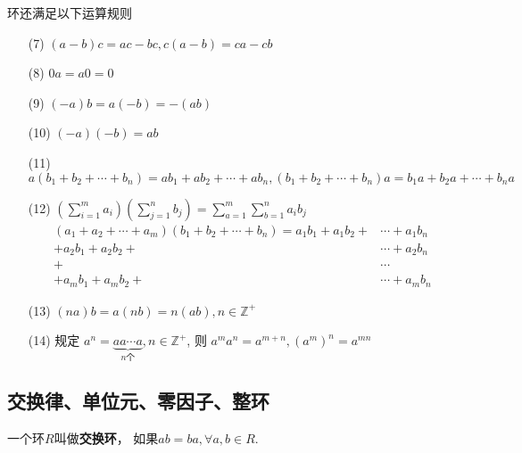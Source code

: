 
\begin{Theorem}
环还满足以下运算规则
\begin{enumerate}[(1)]
\item[(7)] $(a-b)c = ac - bc, c(a - b) = ca - cb$
\item[(8)] $\mathfrak{0}a = a\mathfrak{0} = \mathfrak{0}$
\item[(9)] $(-a)b = a(-b) = -(ab)$
\item[(10)] $(-a)(-b) = ab$
\item[(11)] $a(b_1 + b_2 + \cdots + b_n) = ab_1 +ab_2 + \cdots + ab_n, (b_1 + b_2 + \cdots + b_n)a = b_1a + b_2a + \cdots + b_na$
\item[(12)] 
$ \displaystyle \left( \sum_{i=1}^m a_i \right) \left( \sum_{j=1}^n b_j \right) 
= \sum_{a=1}^m \sum_{b=1}^{n} a_i b_j $
           $$
\begin{aligned}
(a_1 + a_2 + \cdots + a_m) (b_1 + b_2 + \cdots + b_n) 
= 
a_1b_1 + a_1 b_2 + &\cdots + a_1 b_n \\
+ a_2 b_1 + a_2 b_2 + &\cdots + a_2 b_n \\
+ &\cdots \\
+ a_m b_1 + a_m b_2 + &\cdots + a_m b_n
\end{aligned}
 $$
 \item[(13)] $ (na)b = a(nb) = n(ab), n \in \mathbb{Z}^+$ 
 \item[(14)] 规定 $a^n = \underbrace{a a \cdots a}_{n\text{个}}, n \in \mathbb{Z}^{+}$, 则 $ a^m a^n = a^{m+n}, (a^m)^n = a^{mn} $
\end{enumerate}
\end{Theorem}

\subsection{交换律、单位元、零因子、整环}

\begin{Definition}[交换环]
一个环$R$叫做\textbf{交换环}， 如果$ab = ba,  \forall a, b \in R$.
\end{Definition}

